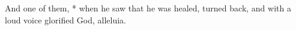 And one of them, * when he saw that he was healed, turned back, and with a loud voice glorified God, alleluia.